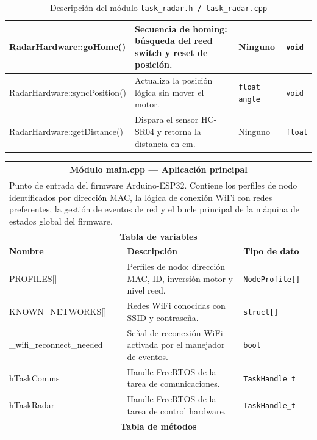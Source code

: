 \begin{table}[h!]
\begin{tabular}{|p{2.8cm}|p{5.5cm}|p{2.8cm}|p{1.7cm}|}
\hline
RadarHardware::goHome() & Secuencia de homing: búsqueda del reed switch y reset de posición. & Ninguno & \texttt{void} \\
\hline
RadarHardware::syncPosition() & Actualiza la posición lógica sin mover el motor. & \texttt{float angle} & \texttt{void} \\
\hline
RadarHardware::getDistance() & Dispara el sensor HC-SR04 y retorna la distancia en cm. & Ninguno & \texttt{float} \\
\hline
\end{tabular}
\caption{Descripción del módulo \texttt{task\_radar.h / task\_radar.cpp}}
\label{tab:module_radar}
\end{table}

\begin{table}[h!]
\centering
\small
\renewcommand{\arraystretch}{1.25}
\begin{tabular}{|p{2.8cm}|p{5.5cm}|p{2.8cm}|p{1.7cm}|}
\hline
\multicolumn{4}{|c|}{\textbf{Módulo main.cpp — Aplicación principal}} \\
\hline
\multicolumn{4}{|p{12.8cm}|}{Punto de entrada del firmware Arduino-ESP32. Contiene
los perfiles de nodo identificados por dirección MAC, la lógica de conexión WiFi
con redes preferentes, la gestión de eventos de red y el bucle principal de la
máquina de estados global del firmware.} \\
\hline
\multicolumn{4}{|c|}{\textbf{Tabla de variables}} \\
\hline
\textbf{Nombre} & \textbf{Descripción} & \multicolumn{2}{l|}{\textbf{Tipo de dato}} \\
\hline
PROFILES[] & Perfiles de nodo: dirección MAC, ID, inversión motor y nivel reed. & \multicolumn{2}{l|}{\texttt{NodeProfile[]}} \\
\hline
KNOWN\_NETWORKS[] & Redes WiFi conocidas con SSID y contraseña. & \multicolumn{2}{l|}{\texttt{struct[]}} \\
\hline
\_wifi\_reconnect\_needed & Señal de reconexión WiFi activada por el manejador de eventos. & \multicolumn{2}{l|}{\texttt{bool}} \\
\hline
hTaskComms & Handle FreeRTOS de la tarea de comunicaciones. & \multicolumn{2}{l|}{\texttt{TaskHandle\_t}} \\
\hline
hTaskRadar & Handle FreeRTOS de la tarea de control hardware. & \multicolumn{2}{l|}{\texttt{TaskHandle\_t}} \\
\hline
\multicolumn{4}{|c|}{\textbf{Tabla de métodos}} \\

\end{tabular}
\end{table}
